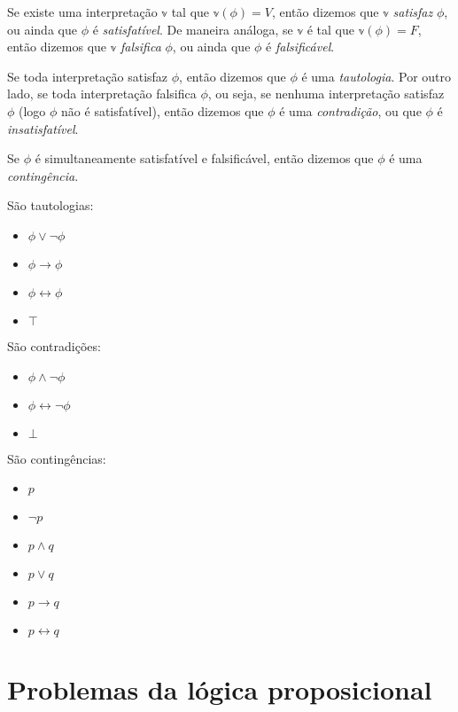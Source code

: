 \begin{definition}
	Se existe uma interpretação $\mathbb{v}$ tal que $\mathbb{v}(\phi) = V$, então dizemos que $\mathbb{v}$ \emph{satisfaz} $\phi$, ou ainda que $\phi$ é \emph{satisfatível}. De maneira análoga, se $\mathbb{v}$ é tal que $\mathbb{v}(\phi) = F$, então dizemos que $\mathbb{v}$ \emph{falsifica} $\phi$, ou ainda que $\phi$ é \emph{falsificável}.
	
	Se toda interpretação satisfaz $\phi$, então dizemos que $\phi$ é uma \emph{tautologia}. Por outro lado, se toda interpretação falsifica $\phi$, ou seja, se nenhuma interpretação satisfaz $\phi$ (logo $\phi$ não é satisfatível), então dizemos que $\phi$ é uma \emph{contradição}, ou que $\phi$ é \emph{insatisfatível}.
	
	Se $\phi$ é simultaneamente satisfatível e falsificável, então dizemos que $\phi$ é uma \emph{contingência}.
\end{definition}

\begin{example}
    São tautologias:
    \begin{itemize}
        \item $\phi \vee \neg \phi$
        \item $\phi \rightarrow \phi$
        \item $\phi \leftrightarrow \phi$
        \item $\top$
    \end{itemize}
    São contradições:
    \begin{itemize}
        \item $\phi \wedge \neg \phi$
        \item $\phi \leftrightarrow \neg \phi$
        \item $\bot$
    \end{itemize}
    São contingências:
    \begin{itemize}
    	\item $p$
    	\item $\neg p$
    	\item $p \wedge q$
    	\item $p \vee q$
    	\item $p \rightarrow q$
    	\item $p \leftrightarrow q$
    \end{itemize}
\end{example}

\section{Problemas da lógica proposicional}
\label{problemas_da_logica}

